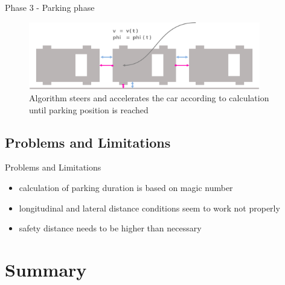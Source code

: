\documentclass[aspectratio=169]{beamer}
\begin{document}
  \begin{frame}{Phase 3 - Parking phase}
  	\begin{figure} [ht]
  		\centering
  		\includegraphics[width=0.9\textwidth]{david_images/Parked.png}
  		\caption{\tiny Algorithm steers and accelerates the car according to calculation until parking position is reached}
	\end{figure}
  \end{frame}
  
  \subsection{Problems and Limitations}
  \begin{frame}{Problems and Limitations}
  	\begin{itemize}
  		\item<1-> calculation of parking duration is based on magic number
  		\item<2-> longitudinal and lateral distance conditions seem to work not properly
  		\item<3-> safety distance needs to be higher than necessary
  	\end{itemize}
  \end{frame}

\section{Summary}
\end{document}
